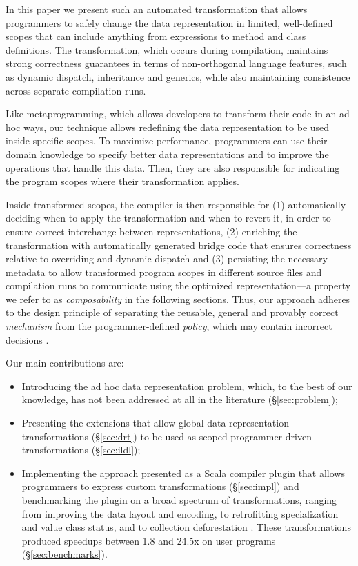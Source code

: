 In this paper we present such an automated transformation that allows programmers to safely change the data representation in limited, well-defined scopes that can include anything from expressions to method and class definitions. The transformation, which occurs during compilation, maintains strong correctness guarantees in terms of non-orthogonal language features, such as dynamic dispatch, inheritance and generics, while also maintaining consistence across separate compilation runs.

Like metaprogramming, which allows developers to transform their code in an ad-hoc ways, our technique allows redefining the data representation to be used inside specific scopes. To maximize performance, programmers can use their domain knowledge to specify better data representations and to improve the operations that handle this data. Then, they are also responsible for indicating the program scopes where their transformation applies.

Inside transformed scopes, the compiler is then responsible for (1) automatically deciding when to apply the transformation and when to revert it, in order to ensure correct interchange between representations, (2) enriching the transformation with automatically generated bridge code that ensures correctness relative to overriding and dynamic dispatch and (3) persisting the necessary metadata to allow transformed program scopes in different source files and compilation runs to communicate using the optimized representation---a property we refer to as \emph{composability} in the following sections. Thus, our approach adheres to the design principle of separating the reusable, general and provably correct \emph{mechanism} from the programmer-defined \emph{policy}, which may contain incorrect decisions \cite{lampson-mechanism-policy}.

Our main contributions are:
\begin{itemize}
  \item Introducing the ad hoc data representation problem, which, to the best of our knowledge, has not been addressed at all in the literature (\S\ref{sec:problem});
  \item Presenting the extensions that allow global data representation transformations (\S\ref{sec:drt}) to be used as scoped programmer-driven transformations (\S\ref{sec:ildl});
  \item Implementing the approach presented as a Scala compiler plugin \cite{ildl-plugin} that allows programmers to express custom transformations (\S\ref{sec:impl}) and benchmarking the plugin on a broad spectrum of transformations, ranging from improving the data layout and encoding, to retrofitting specialization and value class status, and to collection deforestation \cite{wadler-deforestation}. These transformations produced  speedups between 1.8 and 24.5x on user programs (\S\ref{sec:benchmarks}).
\end{itemize}

